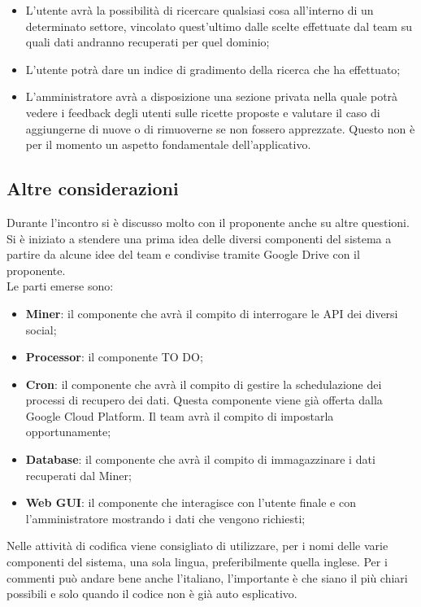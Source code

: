 \begin{itemize}
			\item L'utente avrà la possibilità di ricercare qualsiasi cosa all'interno di un determinato settore, vincolato quest'ultimo dalle scelte effettuate dal team su quali dati andranno recuperati per quel dominio;
			\item L'utente potrà dare un indice di gradimento della ricerca che ha effettuato;
			\item L'amministratore avrà a disposizione una sezione privata nella quale potrà vedere i feedback degli utenti sulle ricette proposte e valutare il caso di aggiungerne di nuove o di rimuoverne se non fossero apprezzate. Questo non è per il momento un aspetto fondamentale dell'applicativo.
		\end{itemize}
	
	\subsection{Altre considerazioni} %
	\label{sub:altre_considerazioni}
	Durante l'incontro si è discusso molto con il proponente anche su altre questioni. \\
	Si è iniziato a stendere una prima idea delle diversi componenti del sistema a partire da alcune idee del team e condivise tramite Google Drive con il proponente. \\
	Le parti emerse sono:
		\begin{itemize}
			\item \textbf{Miner}: il componente che avrà il compito di interrogare le API dei diversi social;
			\item \textbf{Processor}: il componente TO DO;
			\item \textbf{Cron}: il componente che avrà il compito di gestire la schedulazione dei processi di recupero dei dati. Questa componente viene già offerta dalla Google Cloud Platform. Il team avrà il compito di impostarla opportunamente;
			\item \textbf{Database}: il componente che avrà il compito di immagazzinare i dati recuperati dal Miner;
			\item \textbf{Web GUI}: il componente che interagisce con l'utente finale e con l'amministratore mostrando i dati che vengono richiesti;
		\end{itemize}
	\noindent
	Nelle attività di codifica viene consigliato di utilizzare, per i nomi delle varie componenti del sistema, una sola lingua, preferibilmente quella inglese. Per i commenti può andare bene anche l'italiano, l'importante è che siano il più chiari possibili e solo quando il codice non è già auto esplicativo. \\
	
